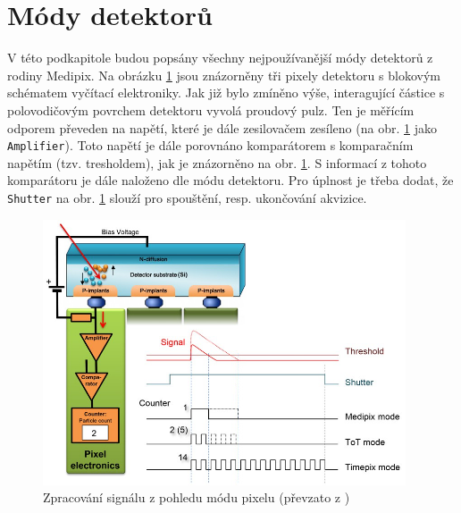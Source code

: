 \section{Módy detektorů}\label{det:mod}
V této podkapitole budou popsány všechny nejpoužívanější módy detektorů z rodiny Medipix. 
Na obrázku \ref{fig:det:signal_proc} jsou znázorněny tři pixely detektoru s blokovým schématem vyčítací elektroniky. Jak již bylo zmíněno výše, interagující částice s polovodičovým povrchem detektoru vyvolá proudový pulz. Ten je měřícím odporem převeden na napětí, které je dále zesilovačem zesíleno (na obr. \ref{fig:det:signal_proc} jako \texttt{Amplifier}). Toto napětí je dále porovnáno komparátorem s komparačním napětím (tzv. tresholdem), jak je znázorněno na obr. \ref{fig:det:signal_proc}. S informací z tohoto komparátoru je dále naloženo dle módu detektoru. Pro úplnost je třeba dodat, že \texttt{Shutter} na obr. \ref{fig:det:signal_proc} slouží pro spouštění, resp. ukončování akvizice.

\begin{figure}[th!]
	\begin{center}
		\includegraphics[width=10.75cm]{figures/det_pix.png}
		\caption{Zpracování signálu z pohledu módu pixelu (převzato z \cite{PlatkevicDisertace})}
		\label{fig:det:signal_proc}
	\end{center}
\end{figure}


